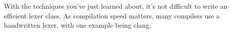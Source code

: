 With the techniques you’ve just learned about, it’s not difficult to write an efficient lexer class. As compilation speed matters, many compilers use a handwritten lexer, with one example being clang.

































